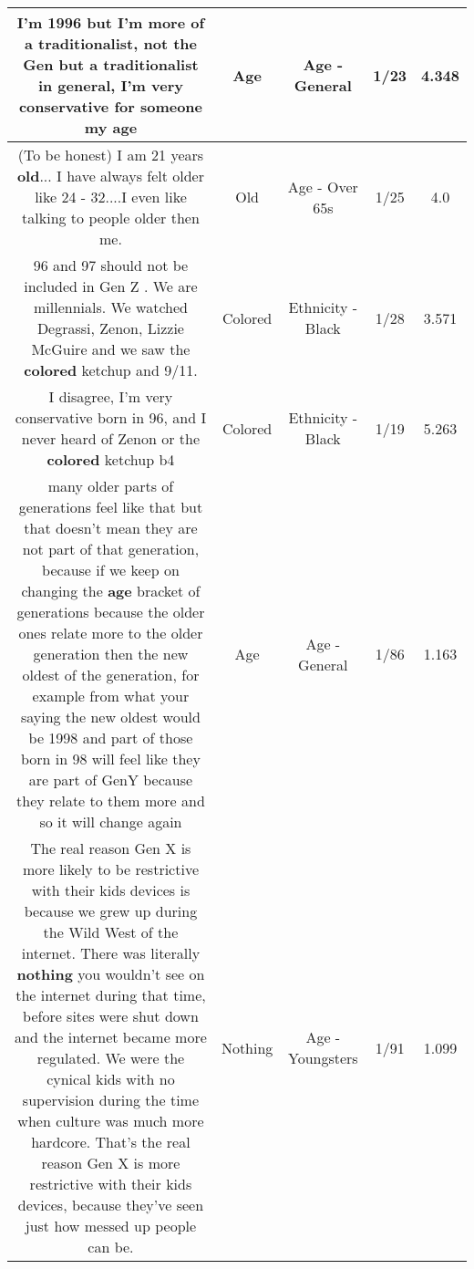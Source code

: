 \documentclass[11pt]{article}
\newlength\mylength
\begin{document}
\begin{center}
\begin{longtable}{|C{.65\mylength}|C{.30\mylength}|C{.12\mylength}|C{.12\mylength}|C{.12\mylength}|}
  \small I'm 1996 but I'm more of a traditionalist, not the Gen but a traditionalist in general, I'm very conservative for someone my age\normalsize   & Age & Age - General & 1/23 & 4.348 \\  \hline
  \small (To be honest) I am 21 years \textbf{old}... I have always felt older like 24 - 32....I even like talking to people older then me.\normalsize   & Old & Age - Over 65s & 1/25 & 4.0 \\  \hline
  \small 96 and 97 should not be included in Gen Z . We are millennials. We watched Degrassi, Zenon, Lizzie McGuire and we saw the \textbf{colored} ketchup and 9/11.\normalsize   & Colored & Ethnicity - Black & 1/28 & 3.571 \\  \hline
  \small I disagree, I'm very conservative born in 96, and I never heard of Zenon or the \textbf{colored} ketchup b4\normalsize   & Colored & Ethnicity - Black & 1/19 & 5.263 \\  \hline
  \small many older parts of generations feel like that but that doesn't mean they are not part of that generation, because if we keep on changing the \textbf{age} bracket of generations because the older ones relate more to the older generation then the new oldest of the generation, for example from what your saying the new oldest would be 1998 and part of those born in 98 will feel like they are part of GenY because they relate to them more and so it will change again\normalsize   & Age & Age - General & 1/86 & 1.163 \\  \hline
  \small The real reason Gen X is more likely to be restrictive with their kids devices is because we grew up during the Wild West of the internet. There was literally \textbf{nothing} you wouldn't see on the internet during that time, before sites were shut down and the internet became more regulated. We were the cynical kids with no supervision during the time when culture was much more hardcore. That's the real reason Gen X is more restrictive with their kids devices, because they've seen just how messed up people can be.\normalsize   & Nothing & Age - Youngsters & 1/91 & 1.099 \\  \hline

\end{longtable}
\end{center}
\end{document}

